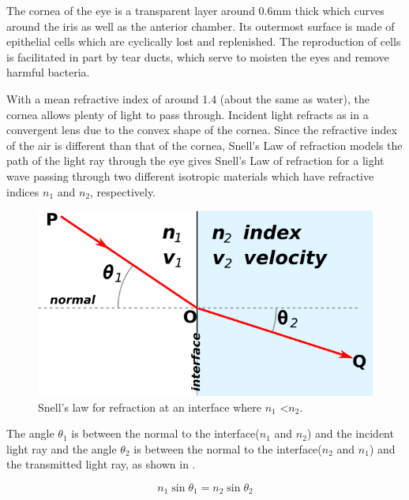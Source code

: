 The cornea of the eye is a transparent layer around 0.6mm thick
which curves around the iris as well as the anterior
chamber.\cite{yaylali1997corneal,thoft1983x,patel1994refractive}
Its outermost surface is made of epithelial cells which are cyclically lost
and replenished.\cite{jester1999cellular,hassell2010molecular} The
reproduction of cells is facilitated in part by tear ducts, which serve
to moisten the eyes and remove harmful bacteria.\cite{holly1977tear}

With a mean refractive index of around 1.4 (about the same as water),
the cornea allows plenty of light to pass through. Incident light refracts
as in a convergent lens due to the convex shape of the cornea. Since
the refractive index of the air is different than that of the cornea, Snell's
Law of refraction models the path of the light ray through the
eye gives Snell's Law of refraction for a light wave
passing through two different isotropic materials which have refractive indices
$n_1$ and $n_2$, respectively.

\begin{figure}[H]
\centering
  \includegraphics{figures/snells}
\caption{Snell's law for refraction at an interface where
             $n_1$ \textless $n_2$.\cite{wikisnell}}
\label{fig:snell}
\end{figure}

The angle $\theta_1$ is between the normal to the interface($n_1$ and $n_2$)
and the incident light ray and the angle $\theta_2$ is between the normal to
the interface($n_2$ and $n_1$) and the transmitted light ray, as shown in
.

\begin{equation}
n_1\sin\theta_1=n_2\sin\theta_2
\label{eq:refractive}
\end{equation}

